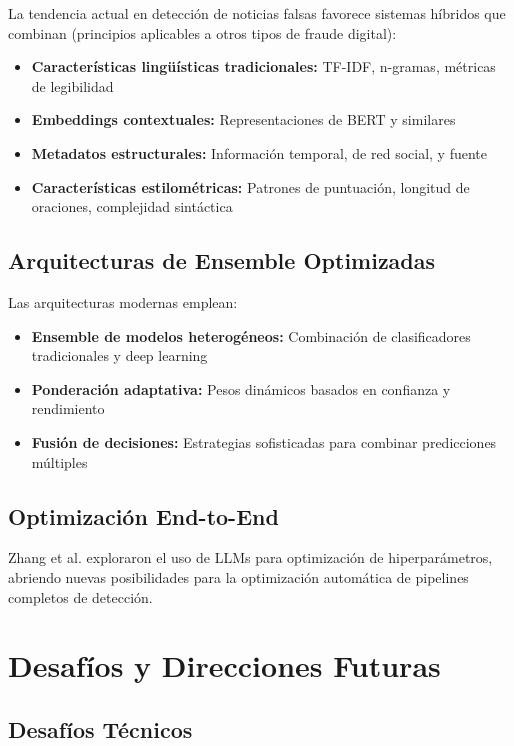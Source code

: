 La tendencia actual en detección de noticias falsas favorece sistemas híbridos que combinan (principios aplicables a otros tipos de fraude digital):
\begin{itemize}
    \item \textbf{Características lingüísticas tradicionales:} TF-IDF, n-gramas, métricas de legibilidad
    \item \textbf{Embeddings contextuales:} Representaciones de BERT y similares
    \item \textbf{Metadatos estructurales:} Información temporal, de red social, y fuente
    \item \textbf{Características estilométricas:} Patrones de puntuación, longitud de oraciones, complejidad sintáctica
\end{itemize}

\subsection{Arquitecturas de Ensemble Optimizadas}

Las arquitecturas modernas emplean:
\begin{itemize}
    \item \textbf{Ensemble de modelos heterogéneos:} Combinación de clasificadores tradicionales y deep learning
    \item \textbf{Ponderación adaptativa:} Pesos dinámicos basados en confianza y rendimiento
    \item \textbf{Fusión de decisiones:} Estrategias sofisticadas para combinar predicciones múltiples
\end{itemize}

\subsection{Optimización End-to-End}

Zhang et al. \cite{zhang2023using} exploraron el uso de LLMs para optimización de hiperparámetros, abriendo nuevas posibilidades para la optimización automática de pipelines completos de detección.

\section{Desafíos y Direcciones Futuras}
\label{sec:desafios_direcciones}

\subsection{Desafíos Técnicos}

